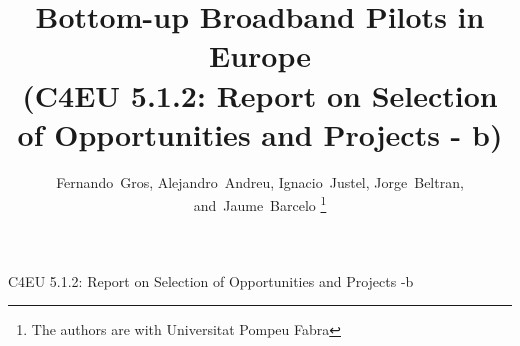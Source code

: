 \documentclass[draftclsnofoot,12pt,journal,onecolumn]{IEEEtran}
\begin{document}
%
\title{Bottom-up Broadband Pilots in Europe \\ (C4EU 5.1.2: Report on Selection of Opportunities and Projects - b)}
%
%
%

\author{
	Fernando~Gros, %
	Alejandro~Andreu, %
	Ignacio~Justel, %
	Jorge~Beltran, %
    and~Jaume~Barcelo%
\thanks{
The authors are with Universitat Pompeu Fabra
}
}


% 
%



%
{C4EU 5.1.2: Report on Selection of Opportunities and Projects -b}
% 
\end{document}

